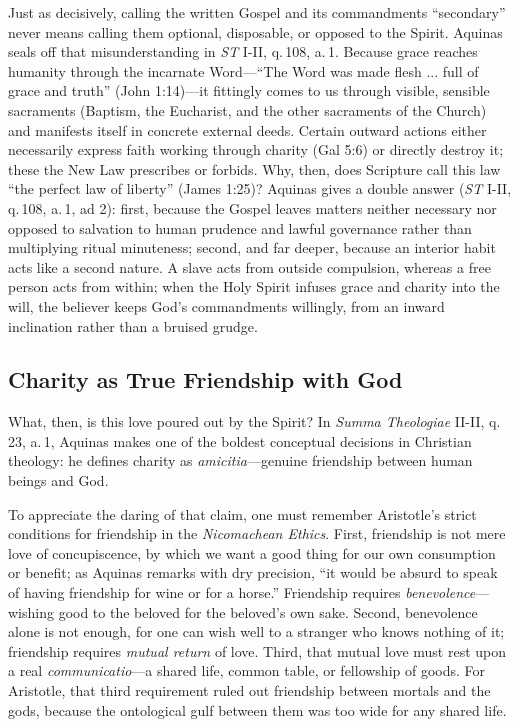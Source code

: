Just as decisively, calling the written Gospel and its commandments ``secondary'' never means calling them optional, disposable, or opposed to the Spirit. Aquinas seals off that misunderstanding in \emph{ST} I-II, q.\,108, a.\,1. Because grace reaches humanity through the incarnate Word---``The Word was made flesh ... full of grace and truth'' (John 1:14)---it fittingly comes to us through visible, sensible sacraments (Baptism, the Eucharist, and the other sacraments of the Church) and manifests itself in concrete external deeds. Certain outward actions either necessarily express faith working through charity (Gal 5:6) or directly destroy it; these the New Law prescribes or forbids. Why, then, does Scripture call this law ``the perfect law of liberty'' (James 1:25)? Aquinas gives a double answer (\emph{ST} I-II, q.\,108, a.\,1, ad 2): first, because the Gospel leaves matters neither necessary nor opposed to salvation to human prudence and lawful governance rather than multiplying ritual minuteness; second, and far deeper, because an interior habit acts like a second nature. A slave acts from outside compulsion, whereas a free person acts from within; when the Holy Spirit infuses grace and charity into the will, the believer keeps God's commandments willingly, from an inward inclination rather than a bruised grudge.

\subsection*{Charity as True Friendship with God}

What, then, is this love poured out by the Spirit? In \emph{Summa Theologiae} II-II, q.\,23, a.\,1, Aquinas makes one of the boldest conceptual decisions in Christian theology: he defines charity as \emph{amicitia}---genuine friendship between human beings and God.

To appreciate the daring of that claim, one must remember Aristotle's strict conditions for friendship in the \emph{Nicomachean Ethics}. First, friendship is not mere love of concupiscence, by which we want a good thing for our own consumption or benefit; as Aquinas remarks with dry precision, ``it would be absurd to speak of having friendship for wine or for a horse.'' Friendship requires \emph{benevolence}---wishing good to the beloved for the beloved's own sake. Second, benevolence alone is not enough, for one can wish well to a stranger who knows nothing of it; friendship requires \emph{mutual return} of love. Third, that mutual love must rest upon a real \emph{communicatio}---a shared life, common table, or fellowship of goods. For Aristotle, that third requirement ruled out friendship between mortals and the gods, because the ontological gulf between them was too wide for any shared life.

